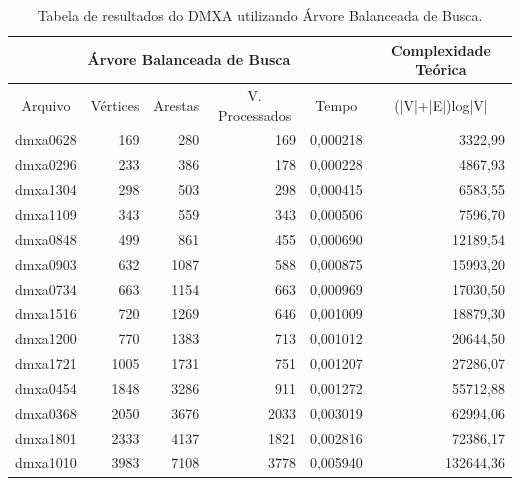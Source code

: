 \documentclass[
	12pt,				%
	oneside,			%
	a4paper,			%
	english,			%
	french,				%
	spanish,			%
	brazil,				%
	]{abntex2}
\begin{document}
\begin{table}[H]
  \centering    
  \begin{tabular}{|c|r|r|r|r|r|}
    \toprule
    \multicolumn{5}{|c|}{\cellcolor{gray!25}\textbf{Árvore Balanceada de Busca}} & \multicolumn{1}{|c|}{\cellcolor{gray!25}\textbf{Complexidade Teórica}}\\
    \midrule
    \multicolumn{1}{|c|}{\cellcolor{gray!10}Arquivo} & \multicolumn{1}{|c|}{\cellcolor{gray!10}Vértices} & \multicolumn{1}{|c|}{\cellcolor{gray!10}Arestas} & \multicolumn{1}{|c|}{\cellcolor{gray!10}V. Processados} & \multicolumn{1}{|c|}{\cellcolor{gray!10}Tempo} & \multicolumn{1}{|c|}{\cellcolor{gray!10}(|V|+|E|)log|V|}\\
    \hline
    dmxa0628	&	169	&	280	&	169	&	0,000218	&	3322,99	\\
    \hline
    dmxa0296	&	233	&	386	&	178	&	0,000228	&	4867,93	\\
    \hline
    dmxa1304	&	298	&	503	&	298	&	0,000415	&	6583,55	\\
    \hline
    dmxa1109	&	343	&	559	&	343	&	0,000506	&	7596,70	\\
    \hline
    dmxa0848	&	499	&	861	&	455	&	0,000690	&	12189,54	\\
    \hline
    dmxa0903	&	632	&	1087	&	588	&	0,000875	&	15993,20	\\
    \hline
    dmxa0734	&	663	&	1154	&	663	&	0,000969	&	17030,50	\\
    \hline
    dmxa1516	&	720	&	1269	&	646	&	0,001009	&	18879,30	\\
    \hline
    dmxa1200	&	770	&	1383	&	713	&	0,001012	&	20644,50	\\
    \hline
    dmxa1721	&	1005	&	1731	&	751	&	0,001207	&	27286,07	\\
    \hline
    dmxa0454	&	1848	&	3286	&	911	&	0,001272	&	55712,88	\\
    \hline
    dmxa0368	&	2050	&	3676	&	2033	&	0,003019	&	62994,06	\\
    \hline
    dmxa1801	&	2333	&	4137	&	1821	&	0,002816	&	72386,17	\\
    \hline
    dmxa1010	&	3983	&	7108	&	3778	&	0,005940	&	132644,36	\\
    \hline
  \end{tabular}
  \caption{Tabela de resultados do DMXA utilizando Árvore Balanceada de Busca.}  
  \label{tab:DmxaArvore}
\end{table}
\end{document}

